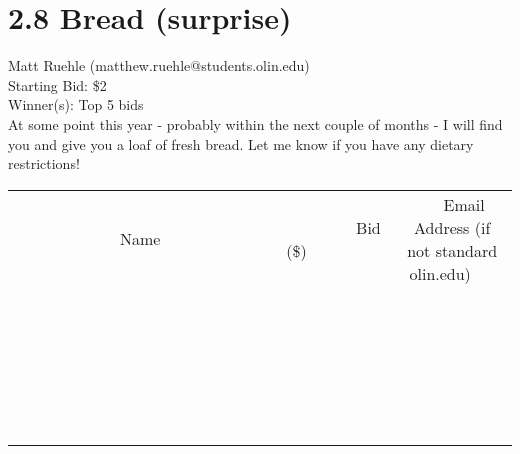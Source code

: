 \documentclass[11pt]{article}
\begin{document}
\section*{2.8 Bread (surprise)}
Matt Ruehle (matthew.ruehle@students.olin.edu) \\
Starting Bid: \$2 \\
Winner(s): 
Top 5 bids \\
At some point this year - probably within the next couple of months - I will find you and give you a loaf of fresh bread. Let me know if you have any dietary restrictions! \\[6ex]
\begin{tabular}{c c c}
~~~~~~~~~~~~~Name~~~~~~~~~~~~~ & ~~~~~~~~~Bid (\$)~~~~~~~~~ & ~~~Email Address (if not standard olin.edu)~~~ \\
 & & \\
\hline
 & & \\
\hline
 & & \\
\hline
 & & \\
\hline
 & & \\
\hline
 & & \\
\hline
 & & \\
\hline
 & & \\
\hline
 & & \\
\hline
 & & \\
\hline
 & & \\
\hline
 & & \\
\hline
 & & \\
\hline
 & & \\
\hline
 & & \\
\hline
 & & \\
\hline
 & & \\
\hline
 & & \\
\hline
 & & \\
\hline
 & & \\
\hline
 & & \\
\hline
 & & \\
\hline
 & & \\
\hline
 & & \\
\hline
 & & \\
\hline
 & & \\
\hline
\end{tabular}
\clearpage
\end{document}
